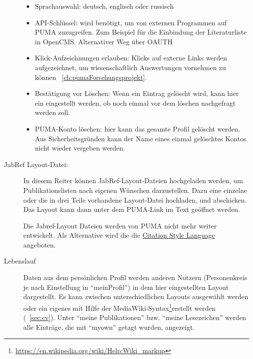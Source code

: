 \begin{description}
\begin{itemize}
      \item Sprachauswahl: deutsch, englisch oder russisch
      \item API-Schlüssel: wird benötigt, um von externen Programmen auf PUMA zuzugreifen. Zum Beispiel für die Einbindung der Literaturliste in OpenCMS. Alternativer Weg über OAUTH 
      \item Klick-Aufzeichnungen erlauben: Klicks auf externe Links werden aufgezeichnet, um wissenschaftlich Auswertungen vornehmen zu können ~\autoref{ch:pumaForschungsprojekt}.
      \item Bestätigung vor Löschen: Wenn ein Eintrag gelöscht wird, kann hier ein eingestellt werden, ob noch einmal vor dem löschen nachgefragt werden soll.
      \item PUMA-Konto löschen: hier kann das gesamte Profil gelöscht werden. Aus Sicherheitsgründen kann der Name eines einmal gelöschtes Kontos nicht wieder vergeben werden.
			\end{itemize}
   \item[JabRef Layout-Datei:] 
	In diesem Reiter können JabRef-Layout-Dateien hochgeladen werden, um Publikationslisten nach eigenen Wünschen darzustellen. Dazu eine einzelne oder die in drei Teile vorhandene Layout-Datei hochladen, und abschicken. Das Layout kann dann unter dem PUMA-Link im Text geöffnet werden. %
\begin{tip} Die Jabref-Layout Dateien werden von PUMA nicht mehr weiter entwickelt. Als Alternative wird die die \href{http://citationstyles.org/}{Citation Style Language} angeboten.
\end{tip}
\item[Lebenslauf\index{Lebenslauf}]
Daten aus dem persönlichen Profil werden anderen Nutzern (Personenkreis je nach Einstellung in \enquote{meinProfil}) in dem hier eingestellten Layout dargestellt. Es kann zwischen unterschiedlichen Layouts ausgewählt werden oder ein eigenes mit Hilfe der MediaWiki-Syntax\footnote{\url{https://en.wikipedia.org/wiki/Help:Wiki_markup}}erstellt werden (~\autoref{sec:cv}). Unter \enquote{meine Publikationen} bzw. \enquote{meine Lesezeichen} werden alle Einträge, die mit \enquote{myown} getagt wurden, angezeigt.

\end{description}
